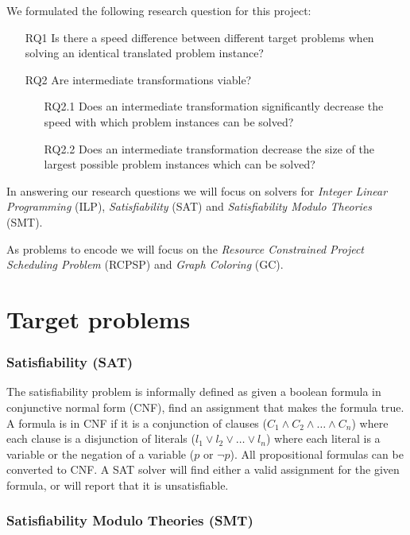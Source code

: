 \documentclass{sig-alternate}
\begin{document}
We formulated the following research question for this project:

\begin{enumerate}
\item[RQ1]{Is there a speed difference between different target problems when solving an identical translated problem instance?}
\item[RQ2]{Are intermediate transformations viable?}
	\begin{enumerate}
	\item[RQ2.1]{Does an intermediate transformation significantly decrease the speed with which problem instances can be solved?}
	\item[RQ2.2]{Does an intermediate transformation decrease the size of the largest possible problem instances which can be solved?}
	\end{enumerate}
\end{enumerate}

In answering our research questions we will focus on solvers for \emph{Integer Linear Programming} (ILP), \emph{Satisfiability} (SAT) and \emph{Satisfiability Modulo Theories} (SMT).

As problems to encode we will focus on the \emph{Resource Constrained Project Scheduling Problem} (RCPSP) and \emph{Graph Coloring} (GC).

\section {Target problems}

\subsubsection*{Satisfiability (SAT)}

The satisfiability problem is informally defined as given a boolean formula in conjunctive normal form (CNF), find an assignment that makes the formula true.
A formula is in CNF if it is a conjunction of clauses ($C_1 \wedge C_2 \wedge \ldots \wedge C_n$) where each clause is a disjunction of literals ($l_1 \lor l_2 \lor \ldots \lor l_n$) where each literal is a variable or the negation of a variable ($p$ or $\neg p$).
All propositional formulas can be converted to CNF.
A SAT solver will find either a valid assignment for the given formula, or will report that it is unsatisfiable.

\subsubsection*{Satisfiability Modulo Theories (SMT)}
\end{document}

